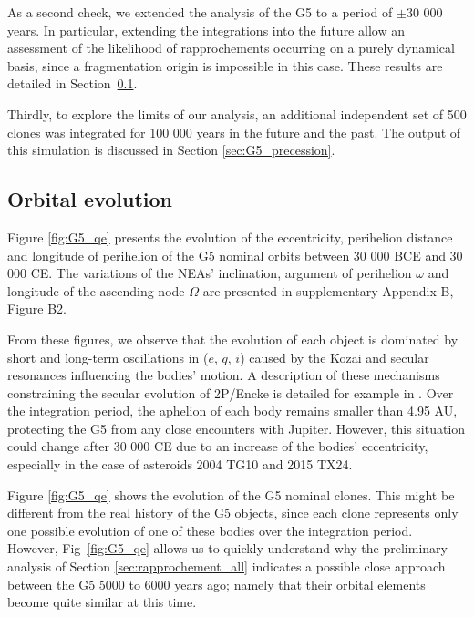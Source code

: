 \documentclass[letters,a4paper,fleqn,usenatbib]{mnras}
\begin{document}
As a second check, we extended the analysis of the G5 to a period of $\pm$30 000 years. In particular, extending the integrations into the future allow an assessment of the likelihood of rapprochements occurring on a purely dynamical basis, since a fragmentation origin is impossible in this case. These results are detailed in Section~\ref{sec:G5_orbit}. 

Thirdly, to explore the limits of our analysis, an additional independent set of 500 clones was integrated for 100 000 years in the future and the past. The output of this simulation is discussed in Section \ref{sec:G5_precession}.
 
 \subsection{Orbital evolution} \label{sec:G5_orbit}
 
 
 
 Figure \ref{fig:G5_qe} presents the evolution of the eccentricity, perihelion distance and longitude of perihelion of the G5 nominal orbits between 30 000 BCE and 30 000 CE. The variations of the NEAs' inclination, argument of perihelion $\omega$ and longitude of the ascending node $\Omega$ are presented in supplementary Appendix B, Figure B2.
 

 From these figures, we observe that the evolution of each object is dominated by short and long-term oscillations in ($e$, $q$, $i$) caused by the Kozai and secular resonances influencing the bodies' motion. A description of these mechanisms constraining the secular evolution of 2P/Encke is detailed for example in \cite{Valsecchi1995}. Over the integration period, the aphelion of each body remains smaller than 4.95 AU, protecting the G5 from any close encounters with Jupiter. However, this situation could change after 30 000 CE due to an increase of the bodies' eccentricity, especially in the case of asteroids 2004 TG10 and 2015 TX24. 

 Figure \ref{fig:G5_qe} shows the evolution of the G5 nominal clones. This might be different from the real history of the G5 objects, since each clone represents only one possible evolution of one of these bodies over the integration period. However,  Fig~\ref{fig:G5_qe} allows us to quickly understand why the preliminary analysis of Section \ref{sec:rapprochement_all} indicates a possible close approach between the G5 5000 to 6000 years ago; namely that their orbital elements become quite similar at this time. 
 
\end{document}
